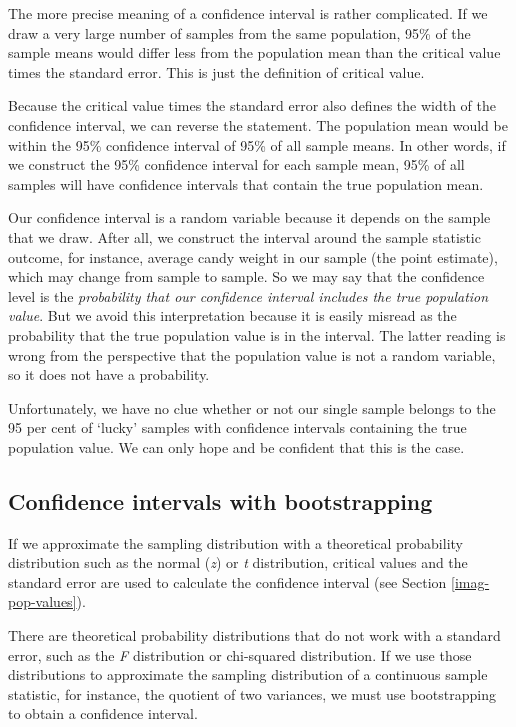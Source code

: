 \documentclass[a4paper]{book}
\theoremstyle{definition}
\theoremstyle{definition}
\theoremstyle{definition}
\theoremstyle{remark}
\begin{document}
The more precise meaning of a confidence interval is rather complicated.
If we draw a very large number of samples from the same population, 95\%
of the sample means would differ less from the population mean than the
critical value times the standard error. This is just the definition of
critical value.

Because the critical value times the standard error also defines the
width of the confidence interval, we can reverse the statement. The
population mean would be within the 95\% confidence interval of 95\% of
all sample means. In other words, if we construct the 95\% confidence
interval for each sample mean, 95\% of all samples will have confidence
intervals that contain the true population mean.

Our confidence interval is a random variable because it depends on the
sample that we draw. After all, we construct the interval around the
sample statistic outcome, for instance, average candy weight in our
sample (the point estimate), which may change from sample to sample. So
we may say that the confidence level is the \emph{probability that our
confidence interval includes the true population value}. But we avoid
this interpretation because it is easily misread as the probability that
the true population value is in the interval. The latter reading is
wrong from the perspective that the population value is not a random
variable, so it does not have a probability.

Unfortunately, we have no clue whether or not our single sample belongs
to the 95 per cent of `lucky' samples with confidence intervals
containing the true population value. We can only hope and be confident
that this is the case.

\subsection{Confidence intervals with
bootstrapping}\label{bootstrap-confidenceinterval}

If we approximate the sampling distribution with a theoretical
probability distribution such as the normal (\emph{z}) or \emph{t}
distribution, critical values and the standard error are used to
calculate the confidence interval (see Section \ref{imag-pop-values}).

There are theoretical probability distributions that do not work with a
standard error, such as the \emph{F} distribution or chi-squared
distribution. If we use those distributions to approximate the sampling
distribution of a continuous sample statistic, for instance, the
quotient of two variances, we must use bootstrapping to obtain a
confidence interval.
\end{document}
